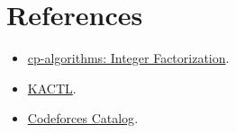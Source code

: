 \section*{References}

\begin{itemize}
  \item \href{https://cp-algorithms.com/algebra/factorization.html}{cp-algorithms: Integer Factorization}.
  \item \href{https://github.com/kth-competitive-programming/kactl}{KACTL}.
  \item \href{https://codeforces.com/catalog}{Codeforces Catalog}.
\end{itemize}

